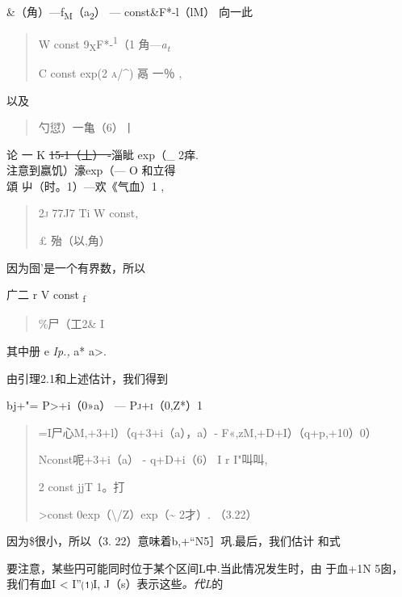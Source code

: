 \textbar{}\&（角）---f\textsubscript{M}（a\textsubscript{2}） \textbar{}
--- const\textbar{}\&F*-l（lM） \textbar{} \textbar{}向一此\textbar{}

\begin{quote}
W const \textbar{}9\textsubscript{X}F*-\textsuperscript{1}（1 \textbar{}
\textbar{}角---\emph{a\textsubscript{t} \textbar{}}

C const exp(2 \textsc{a/\^{})} \textbar{}鬲 一％ \textbar{},
\end{quote}

以及

\begin{quote}
\textbar{}勺愆）一亀（6）丨
\end{quote}

论 一 K \sout{15-1（丄）\textbar{} -}淄眦 exp（\_ 2痒.\\
注意到\textbar{}嬴饥）\textbar{}濠exp（--- O 和立得\\
頌 屮（时。1）---欢《气血）1 ,

\begin{quote}
\textsc{2j} 77J7 Ti W const,

£ \textbar{}殆（以,角）\textbar{}
\end{quote}

因为囹'是一个有界数，所以

广二 r V const \textsubscript{f}

\begin{quote}
\textbar{}\%尸（工2\& I
\end{quote}

其中册 e \emph{Ip.,} a* a\textgreater{}.

由引理2.1和上述估计，我们得到

\textbar{}bj+"= \textbar{}P\textgreater{}+i（0»a） ---
\textsc{Pj+i（0,Z*）1}

\begin{quote}
=I尸心M,+3+l）（q+3+i（a），a）- F«,zM,+D+I）（q+p,+10）0）\textbar{}

Nconst呢+3+i（a） - q+D+i（6） I r {I"叫叫},

2 const jjT 1。打

\textgreater{}const
0\textbar{}exp（\textbackslash{}/Z）exp（\textasciitilde{} 2才）.
（3.22）
\end{quote}

因为\$很小，所以（3. 22）意味着\textbar{}b,+``N5］巩.最后，我们估计 和式

要注意，某些円可能同时位于某个区间L中.当此情况发生时，由 于血+1N
5囱\textbar{}，我们有血I \textless{} I''⑴I, J（s）表示这些\emph{。代L}的

